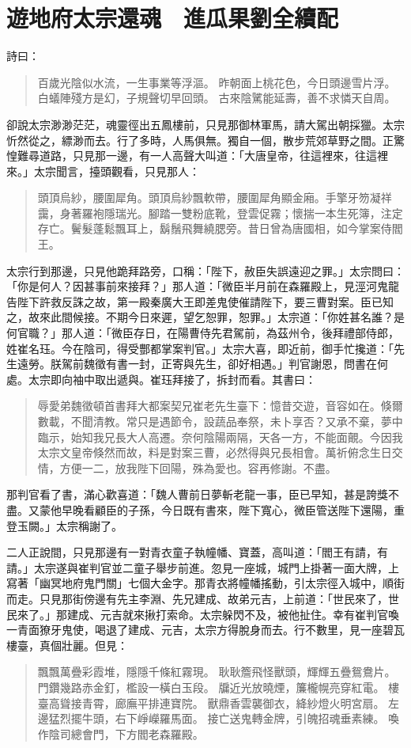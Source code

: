 
\chapter{遊地府太宗還魂　進瓜果劉全續配}

詩曰：
\begin{quote}
百歲光陰似水流，一生事業等浮漚。
昨朝面上桃花色，今日頭邊雪片浮。
白蟻陣殘方是幻，子規聲切早回頭。
古來陰騭能延壽，善不求憐天自周。
\end{quote}

卻說太宗渺渺茫茫，魂靈徑出五鳳樓前，只見那御林軍馬，請大駕出朝採獵。太宗忻然從之，縹渺而去。行了多時，人馬俱無。獨自一個，散步荒郊草野之間。正驚惶難尋道路，只見那一邊，有一人高聲大叫道：「大唐皇帝，往這裡來，往這裡來。」太宗聞言，擡頭觀看，只見那人：
\begin{quote}
頭頂烏紗，腰圍犀角。頭頂烏紗飄軟帶，腰圍犀角顯金廂。手擎牙笏凝祥靄，身著羅袍隱瑞光。腳踏一雙粉底靴，登雲促霧；懷揣一本生死簿，注定存亡。鬢髮蓬鬆飄耳上，鬍鬚飛舞繞腮旁。昔日曾為唐國相，如今掌案侍閻王。
\end{quote}

太宗行到那邊，只見他跪拜路旁，口稱：「陛下，赦臣失誤遠迎之罪。」太宗問曰：「你是何人？因甚事前來接拜？」那人道：「微臣半月前在森羅殿上，見涇河鬼龍告陛下許救反誅之故，第一殿秦廣大王即差鬼使催請陛下，要三曹對案。臣已知之，故來此間候接。不期今日來遲，望乞恕罪，恕罪。」太宗道：「你姓甚名誰？是何官職？」那人道：「微臣存日，在陽曹侍先君駕前，為茲州令，後拜禮部侍郎，姓崔名珏。今在陰司，得受酆都掌案判官。」太宗大喜，即近前，御手忙攙道：「先生遠勞。朕駕前魏徵有書一封，正寄與先生，卻好相遇。」判官謝恩，問書在何處。太宗即向袖中取出遞與。崔珏拜接了，拆封而看。其書曰：
\begin{quote}
辱愛弟魏徵頓首書拜大都案契兄崔老先生臺下：憶昔交遊，音容如在。倏爾數載，不聞清教。常只是遇節令，設蔬品奉祭，未卜享否？又承不棄，夢中臨示，始知我兄長大人高遷。奈何陰陽兩隔，天各一方，不能面覿。今因我太宗文皇帝倏然而故，料是對案三曹，必然得與兄長相會。萬祈俯念生日交情，方便一二，放我陛下回陽，殊為愛也。容再修謝。不盡。
\end{quote}

那判官看了書，滿心歡喜道：「魏人曹前日夢斬老龍一事，臣已早知，甚是誇獎不盡。又蒙他早晚看顧臣的子孫，今日既有書來，陛下寬心，微臣管送陛下還陽，重登玉闕。」太宗稱謝了。

二人正說間，只見那邊有一對青衣童子執幢幡、寶蓋，高叫道：「閻王有請，有請。」太宗遂與崔判官並二童子舉步前進。忽見一座城，城門上掛著一面大牌，上寫著「幽冥地府鬼門關」七個大金字。那青衣將幢幡搖動，引太宗徑入城中，順街而走。只見那街傍邊有先主李淵、先兄建成、故弟元吉，上前道：「世民來了，世民來了。」那建成、元吉就來揪打索命。太宗躲閃不及，被他扯住。幸有崔判官喚一青面獠牙鬼使，喝退了建成、元吉，太宗方得脫身而去。行不數里，見一座碧瓦樓臺，真個壯麗。但見：
\begin{quote}
飄飄萬疊彩霞堆，隱隱千條紅霧現。
耿耿簷飛怪獸頭，輝輝五疊鴛鴦片。
門鑽幾路赤金釘，檻設一橫白玉段。
牖近光放曉煙，簾櫳幌亮穿紅電。
樓臺高聳接青霄，廊廡平排連寶院。
獸鼎香雲襲御衣，絳紗燈火明宮扇。
左邊猛烈擺牛頭，右下崢嶸羅馬面。
接亡送鬼轉金牌，引魄招魂垂素練。
喚作陰司總會門，下方閻老森羅殿。
\end{quote}

